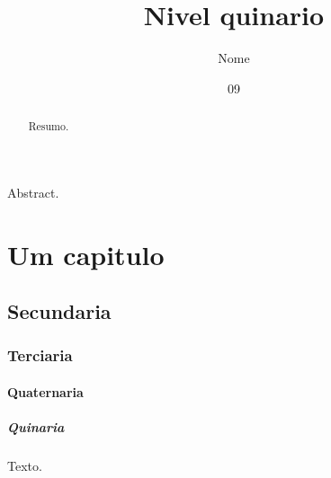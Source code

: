 \documentclass[dsc]{ufrj}
\title{Nivel quinario}
\author{Nome}{Sobrenome}
\date{09}{2026}
\begin{document}
  \maketitle
  \frontmatter
  \begin{abstract}Resumo.\end{abstract}
  \begin{foreignabstract}Abstract.\end{foreignabstract}
  \tableofcontents
  \mainmatter
  \chapter{Um capitulo}
  \section{Secundaria}
  \subsection{Terciaria}
  \subsubsection{Quaternaria}
  \paragraph{Quinaria}
  Texto.
\end{document}
